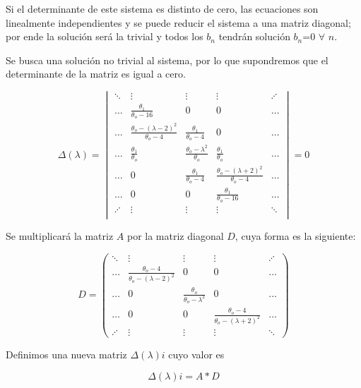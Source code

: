 Si el determinante de este sistema es distinto de cero, las ecuaciones son linealmente independientes y se puede reducir el sistema a una matriz diagonal; por ende la solución será la trivial y todos los $b_n$ tendrán solución $b_n$=$0$ $\forall$ $n$.

Se busca una solución no trivial al sistema, por lo que supondremos que el determinante de la matriz es igual a cero.

\large
\begin{equation}\label{eq:E.10}
\Delta(\lambda)=
\begin{vmatrix}
\ddots  & \vdots & \vdots & \vdots & \iddots \\
\dots &  \frac{\theta_1}{\theta_o-16} & 0 & 0 & \dots \\[0.3cm]
\dots & \frac{\theta_o-(\lambda-2)^2}{\theta_o-4} & \frac{\theta_1}{\theta_o-4} & 0 & \dots\\[0.3cm] 
\dots & \frac{\theta_1}{\theta_o} & \frac{\theta_o-\lambda^2}{\theta_o} & \frac{\theta_1}{\theta_o} & \dots \\[0.3cm]
\ldots & 0 & \frac{\theta_1}{\theta_o-4} & \frac{\theta_o-(\lambda+2)^2}{\theta_o-4}  &  \dots\\[0.3cm] 
\ldots & 0 & 0 & \frac{\theta_1}{\theta_o-16} &  \dots \\
\iddots &  \vdots & \vdots & \vdots  &\ddots \\
\end{vmatrix}=0
\end{equation}
\normalsize

Se multiplicará la matriz $A$ por la matriz diagonal $D$, cuya forma es la siguiente:

\large
\begin{equation}\label{eq:E.11}
D= \begin{pmatrix}
\ddots & \vdots & \vdots & \vdots & \iddots \\
\dots & \frac{\theta_o-4}{\theta_o-(\lambda-2)^2} &0 & 0 & \dots \\[0.3cm] 
\dots & 0 & \frac{\theta_o}{\theta_o-\lambda^2} & 0 & \dots \\[0.3cm]
 \dots & 0 & 0 & \frac{\theta_o-4}{\theta_o-(\lambda+2)^2} & \dots \\[0.3cm]
 \iddots & \vdots & \vdots & \vdots& \ddots
\end{pmatrix}
\end{equation}
\normalsize

Definimos una nueva matriz $\Delta(\lambda){i}$ cuyo valor es

\begin{equation}\label{eq:E.12}
    \Delta(\lambda){i}=A*D
\end{equation}

